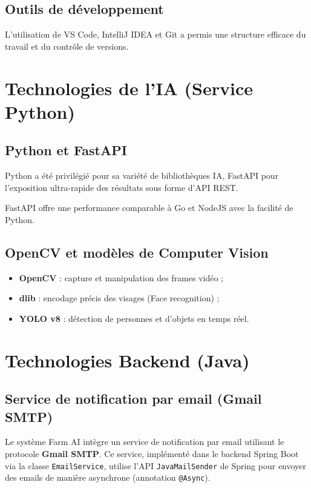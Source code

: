 \documentclass[12pt,a4paper]{report}
\numberwithin{figure}{chapter}
\numberwithin{table}{chapter}
\begin{document}
\subsection{Outils de développement}
L'utilisation de VS Code, IntelliJ IDEA et Git a permis une structure efficace du travail et du
contrôle de versions.

\section{Technologies de l'IA (Service Python)}

\subsection{Python et FastAPI}
Python a été privilégié pour sa variété de bibliothèques IA, FastAPI pour l'exposition ultra-rapide
des résultats sous forme d'API REST.

\begin{infobox}
  FastAPI offre une performance comparable à Go et NodeJS avec la facilité de Python.
\end{infobox}

\subsection{OpenCV et modèles de Computer Vision}
\begin{itemize}
  \item \textbf{OpenCV} : capture et manipulation des frames vidéo ;
  \item \textbf{dlib} : encodage précis des visages (Face recognition) ;
  \item \textbf{YOLO v8} : détection de personnes et d'objets en temps réel.
\end{itemize}

\section{Technologies Backend (Java)}

\subsection{Service de notification par email (Gmail SMTP)}

Le système Farm AI intègre un service de notification par email utilisant le protocole
\textbf{Gmail SMTP}. Ce service, implémenté dans le backend Spring Boot via la classe
\texttt{EmailService}, utilise l'API \texttt{JavaMailSender} de Spring pour envoyer des
emails de manière asynchrone (annotation \texttt{@Async}).
\end{document}
